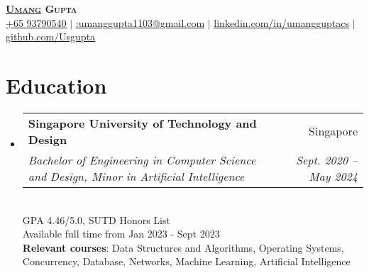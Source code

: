 \documentclass[letterpaper,11pt]{article}
\makeatletter
\newcommand{\resumeSubheading}[4]{
  \vspace{-2pt}\item
    \begin{tabular*}{0.97\textwidth}[t]{l@{\extracolsep{\fill}}r}
      \textbf{#1} & #2 \\
      \textit{\small#3} & \textit{\small #4} \\
    \end{tabular*}\vspace{-7pt}
}
\newcommand{\resumeSubHeadingListStart}{\begin{itemize}[leftmargin=0.15in, label={}]}
\newcommand{\resumeSubHeadingListEnd}{\end{itemize}}
\makeatother
\begin{document}


\begin{center}
    \textbf{\Huge \scshape \underline{Umang} Gupta} \\ \vspace{1pt}
    \small \href{tel:+6593790540}{ \underline {+65 93790540}}
  $|$ \href{mailto:umanggupta1103@gmail.com}{ \underline{:umanggupta1103@gmail.com}} $|$ 
    \href{https://linkedin.com/in/umangguptacs}{ \underline{linkedin.com/in/umangguptacs}} $|$\href{https://github.com/Usgupta}{  \underline{github.com/Usgupta}}
\end{center}


\section{Education}
  \resumeSubHeadingListStart
    \resumeSubheading
      {Singapore University of Technology and Design}{Singapore}
      {Bachelor of Engineering in Computer Science and Design, Minor in Artificial Intelligence}{Sept. 2020 -- May 2024}
      \newline{}
    \\{{GPA 4.46/5.0, SUTD Honors List}}
    \\{Available full time from Jan 2023 - Sept 2023}
    \\\textbf{Relevant courses}{: Data Structures and Algorithms, Operating Systems, Concurrency, Database, Networks, Machine Learning, Artificial Intelligence}
  \resumeSubHeadingListEnd


\end{document}
